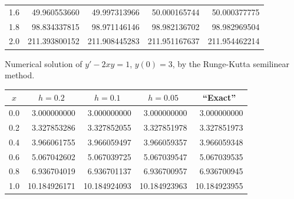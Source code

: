 \begin{examplesolution}
\begin{newtable}
\begin{center}
\begin{tabular}{|c|r|r|r|r|}
      1.6                       & 49.960553660                  & 49.997313966                  & 50.000165744                   & 50.000377775                    \\
      1.8                       & 98.834337815                  & 98.971146146                  & 98.982136702                   & 98.982969504                    \\
      2.0                       & 211.393800152                 & 211.908445283                 & 211.951167637                  & 211.954462214                   \\
      \hline
    \end{tabular}
  \end{center}
\end{newtable}

\begin{newtable}
  \label{table:3.3.4} Numerical solution of $y'-2xy=1$, $y(0)=3$, by the Runge-Kutta semilinear
  method.
  \begin{center}
    \begin{tabular}{|c|r|r|r|r|}
      \hline
      \multicolumn{1}{|c|}{$x$} & \multicolumn{1}{|c|}{$h=0.2$} & \multicolumn{1}{|c|}{$h=0.1$} & \multicolumn{1}{|c|}{$h=0.05$} & \multicolumn{1}{|c|}{``Exact''} \\
      \hline
      0.0                       & 3.000000000                   & 3.000000000                   & 3.000000000                    & 3.000000000                     \\
      0.2                       & 3.327853286                   & 3.327852055                   & 3.327851978                    & 3.327851973                     \\
      0.4                       & 3.966061755                   & 3.966059497                   & 3.966059357                    & 3.966059348                     \\
      0.6                       & 5.067042602                   & 5.067039725                   & 5.067039547                    & 5.067039535                     \\
      0.8                       & 6.936704019                   & 6.936701137                   & 6.936700957                    & 6.936700945                     \\
      1.0                       & 10.184926171                  & 10.184924093                  & 10.184923963                   & 10.184923955                    \\

\end{tabular}
\end{center}
\end{newtable}
\end{examplesolution}
